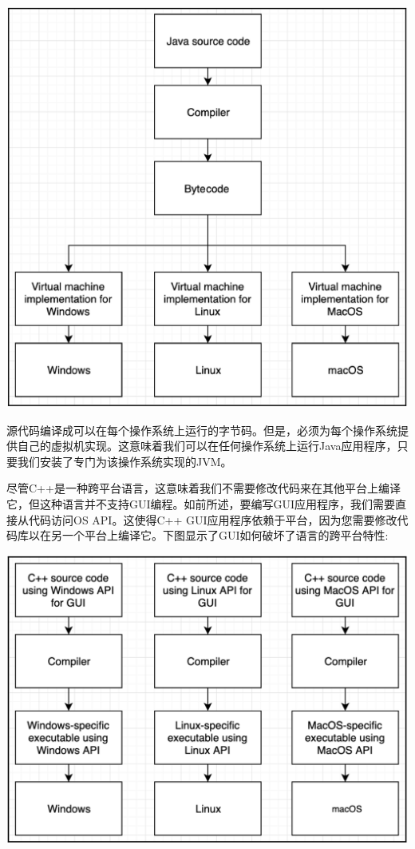 \begin{center}
	\includegraphics[width=1.0\textwidth]{content/Section-2/Chapter-14/2}
\end{center}

源代码编译成可以在每个操作系统上运行的字节码。但是，必须为每个操作系统提供自己的虚拟机实现。这意味着我们可以在任何操作系统上运行Java应用程序，只要我们安装了专门为该操作系统实现的JVM。 \par
尽管C++是一种跨平台语言，这意味着我们不需要修改代码来在其他平台上编译它，但这种语言并不支持GUI编程。如前所述，要编写GUI应用程序，我们需要直接从代码访问OS API。这使得C++ GUI应用程序依赖于平台，因为您需要修改代码库以在另一个平台上编译它。下图显示了GUI如何破坏了语言的跨平台特性: \par

\begin{center}
	\includegraphics[width=1.0\textwidth]{content/Section-2/Chapter-14/3}
\end{center}


